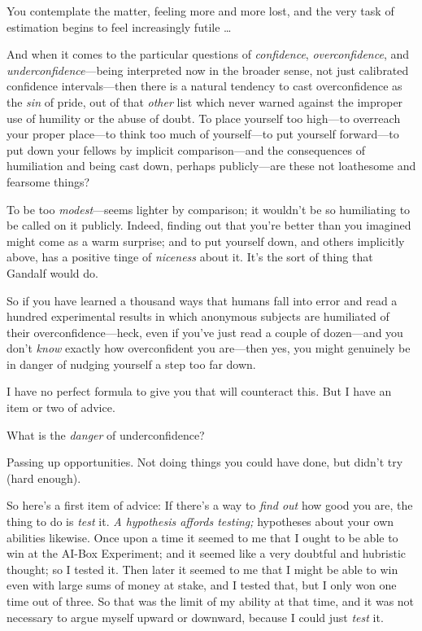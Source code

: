 {
 You contemplate the matter, feeling more and more lost, and the
very task of estimation begins to feel increasingly futile \ldots}

{
 And when it comes to the particular questions of
\textit{confidence}, \textit{overconfidence}, and
\textit{underconfidence}{}---being interpreted now in the broader
sense, not just calibrated confidence intervals---then there is a
natural tendency to cast overconfidence as the \textit{sin} of pride,
out of that \textit{other} list which never warned against the improper
use of humility or the abuse of doubt. To place yourself too high---to
overreach your proper place---to think too much of yourself---to put
yourself forward---to put down your fellows by implicit
comparison---and the consequences of humiliation and being cast down,
perhaps publicly---are these not loathesome and fearsome things?}

{
 To be too \textit{modest}{}---seems lighter by comparison; it
wouldn't be so humiliating to be called on it publicly.
Indeed, finding out that you're better than you
imagined might come as a warm surprise; and to put yourself down, and
others implicitly above, has a positive tinge of \textit{niceness}
about it. It's the sort of thing that Gandalf would
do.}

{
 So if you have learned a thousand ways that humans fall into error
and read a hundred experimental results in which anonymous subjects are
humiliated of their overconfidence---heck, even if
you've just read a couple of dozen---and you
don't \textit{know} exactly how overconfident you
are---then yes, you might genuinely be in danger of nudging yourself a
step too far down.}

{
 I have no perfect formula to give you that will counteract this.
But I have an item or two of advice.}

{
 What is the \textit{danger} of underconfidence?}

{
 Passing up opportunities. Not doing things you could have done,
but didn't try (hard enough).}

{
 So here's a first item of advice: If
there's a way to \textit{find out} how good you are,
the thing to do is \textit{test} it. \textit{A hypothesis affords
testing;} hypotheses about your own abilities likewise. Once upon a
time it seemed to me that I ought to be able to win at the AI-Box
Experiment; and it seemed like a very doubtful and hubristic thought;
so I tested it. Then later it seemed to me that I might be able to win
even with large sums of money at stake, and I tested that, but I only
won one time out of three. So that was the limit of my ability at that
time, and it was not necessary to argue myself upward or downward,
because I could just \textit{test} it.}

